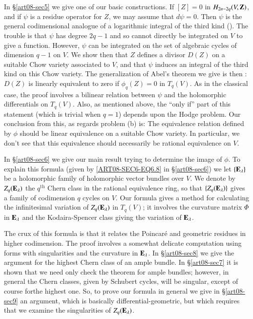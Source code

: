 In \S\ref{art08-sec5} we give one of our basic constructions. If $[Z]=0$ in $H_{2n-2q}\break (V,\bfZ)$, and if $\psi$ is a residue operator for $Z$, we may assume that $d\psi=0$. Then $\psi$ is the general codimensional analogue of a logarithmic integral of the third kind (\cite{art08-key17}). The trouble is that $\psi$ has degree $2q-1$ and so cannot directly be integrated on $V$ to give a function. However, $\psi$ can be integrated on the set of algebraic cycles of dimension $q-1$ on $V$. We show then that $Z$ defines a divisor $D(Z)$ on a suitable Chow variety associated to $V$, and that $\psi$ induces an integral of the third kind on this Chow variety. The generalization of Abel's theorem we give is then : $D(Z)$ is linearly equivalent to zero if $\phi_{q}(Z)=0$ in $T_{q}(V)$. As in the classical case, the proof involves a bilinear relation between $\psi$ and the holomorphic differentials on $T_{q}(V)$. Also, as mentioned above, the ``only if'' part of this statement (which is trivial when $q=1$) depends upon the Hodge problem. Our conclusion from this, as regards problem (b) is: The equivalence relation defined by $\phi$ should be linear equivalence on a suitable Chow variety. In particular, we don't see that this equivalence should necessarily be rational equivalence on $V$.

In \S\ref{art08-sec6} we give our main result trying to determine the image of $\phi$. To explain this formula (given by \eqref{ART08-SEC6-EQ6.8} in \S\ref{art08-sec6}) we let $\{\mathbf{E}_{\lambda}\}$ be a holomorphic family of holomorphic vector bundles over $V$. We denote by $Z_{q}(\mathbf{E}_{\lambda})$ the $q^{\text{th}}$ Chern class in the rational equivalence ring, so that $\{Z_{q}(\mathbf{E}_{\lambda})\}$ gives a family of codimension $q$ cycles on $V$. Our formula gives a method for calculating the infinitesimal variation of $Z_{q}(\mathbf{E}_{\lambda})$ in $T_{q}(V)$; it involves the curvature matrix $\Phi$ in $\mathbf{E}_{\lambda}$ and the Kodaira-Spencer class giving the variation of $\mathbf{E}_{\lambda}$.

The crux of this formula is that it relates the Poincar\'e and geometric residues in higher codimension. The proof involves a somewhat delicate computation using forms with singularities and the curvature in $\mathbf{E}_{\lambda}$. In \S\ref{art08-sec8} we give the argument for the highest Chern class of an ample bundle. In \S\ref{art08-sec7} it is shown that we need only check the theorem for ample bundles; however, in general the Chern classes, given by Schubert cycles, will be singular, except of course for\pageoriginale the highest one. So, to prove our formula in general we give in \S\ref{art08-sec9} an argument, which is basically differential-geometric, but which requires that we examine the singularities of $Z_{q}(\mathbf{E}_{\lambda})$.

